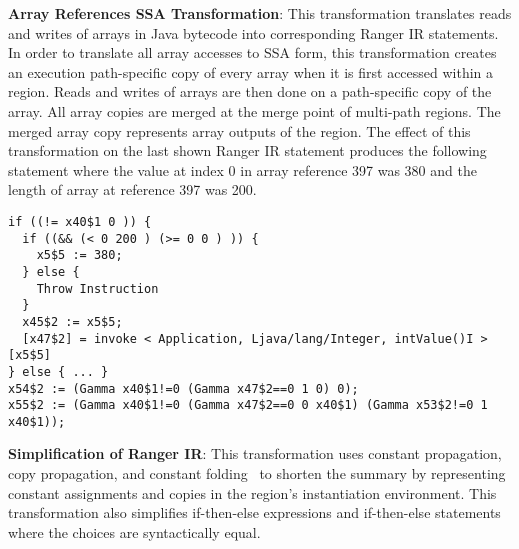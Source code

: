 \textbf{Array References SSA Transformation}: This transformation translates reads and writes of arrays in
Java bytecode into corresponding Ranger IR statements.
%
In order to translate all array accesses to SSA form, this transformation creates an execution path-specific copy of
every array when it is first accessed within a region.
%
Reads and writes of arrays are then done on a path-specific copy of the array.
%
All array copies are merged at the merge point of multi-path regions.
%
The merged array copy represents array outputs of the region.
%
The effect of this transformation on the last shown Ranger IR statement produces the following statement where the
value at index 0 in array reference 397 was 380 and the length of array at reference 397 was 200.\\
\begin{lstlisting}
if ((!= x40$1 0 )) {
  if ((&& (< 0 200 ) (>= 0 0 ) )) {
    x5$5 := 380;
  } else {
    Throw Instruction
  }
  x45$2 := x5$5;
  [x47$2] = invoke < Application, Ljava/lang/Integer, intValue()I >[x5$5]
} else { ... }
x54$2 := (Gamma x40$1!=0 (Gamma x47$2==0 1 0) 0);
x55$2 := (Gamma x40$1!=0 (Gamma x47$2==0 0 x40$1) (Gamma x53$2!=0 1 x40$1));
\end{lstlisting}
%
\textbf{Simplification of Ranger IR}: This transformation uses constant propagation, copy propagation, and constant
folding~\cite{dragon-book} to shorten the summary by representing constant assignments and copies
in the region\rq s instantiation environment.
%
This transformation also simplifies if-then-else expressions and if-then-else statements where the choices are
syntactically equal.
